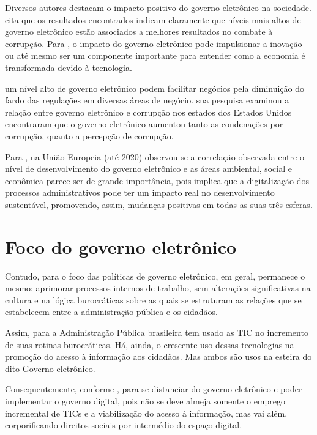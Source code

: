 Diversos autores destacam o impacto positivo do governo eletrônico na sociedade.  \cite{martins2018war} cita que os resultados encontrados indicam claramente que níveis mais altos de governo eletrônico estão associados a melhores resultados no combate à corrupção. Para \cite{kotenok2020government}, o impacto do governo eletrônico pode impulsionar a inovação ou até mesmo ser um componente importante para entender como a economia é transformada   devido à tecnologia.

\cite{martins2022digital} um nível alto de governo eletrônico podem facilitar negócios pela   diminuição do fardo das regulações em diversas áreas de negócio. \cite{sugiarti2024effect} sua pesquisa examinou a relação entre governo eletrônico e corrupção nos   estados dos Estados Unidos encontraram que o governo eletrônico aumentou   tanto as condenações por corrupção, quanto a percepção de corrupção.

Para \cite{ziolo2022government}, na União Europeia (até 2020) observou-se a correlação observada entre o nível de desenvolvimento do governo eletrônico e as áreas ambiental, social e econômica parece ser de grande importância, pois implica que a digitalização dos processos administrativos pode ter um impacto real no desenvolvimento   sustentável, promovendo, assim, mudanças positivas em todas as suas três esferas.

\section{Foco do governo eletrônico}

Contudo, para \cite{de2020governo} o foco das políticas de governo eletrônico, em geral, permanece o mesmo: aprimorar processos internos de  trabalho, sem alterações significativas na cultura e na lógica burocráticas sobre as quais se estruturam as relações que se estabelecem entre a administração pública e os cidadãos.

Assim, para \cite{cristovam2020governo} a Administração Pública brasileira tem usado as TIC no incremento de suas rotinas burocráticas. Há, ainda, o crescente uso dessas tecnologias na promoção do acesso à informação aos cidadãos. Mas ambos são usos na esteira do dito Governo eletrônico.

Consequentemente, conforme \cite{cristovam2020governo}, para se distanciar do governo eletrônico e poder implementar o governo digital, pois não se deve almeja somente o emprego incremental de TICs e a viabilização do acesso à informação, mas vai além, corporificando direitos sociais por intermédio do espaço digital.

